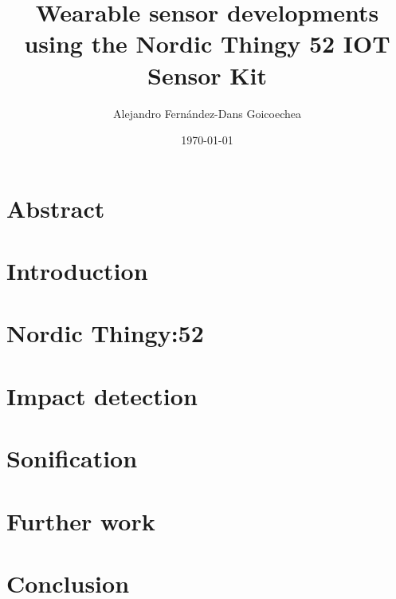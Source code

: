\documentclass[a4paper, 11pt, twoside] {report}
\title{Wearable sensor developments using the Nordic Thingy 52 IOT Sensor Kit}
\author{Alejandro Fernández-Dans Goicoechea}
\date{\today}
\begin{document}
	
	\cleardoublepage

	\setforewordstyle
	
	\cleardoublepage

	\glsunsetall
	\chapter*{}
	
	\cleardoublepage

	\tableofcontents
	\cleardoublepage

	\listoffigures
	\cleardoublepage

	\listoftables
	\cleardoublepage

	\lstlistoflistings
	\cleardoublepage
	\glsresetall

	\chapter*{Abstract}
	
	\cleardoublepage

	\setbodystyle

	\chapter{Introduction}
	
	\cleardoublepage

	\chapter{Nordic Thingy:52}
	
	\cleardoublepage

	\chapter{Impact detection}
	
	\cleardoublepage

	\chapter{Sonification}
	
	\cleardoublepage

	\chapter{Further work}
	
	\cleardoublepage

	\chapter{Conclusion}
	\cleardoublepage
\end{document}
